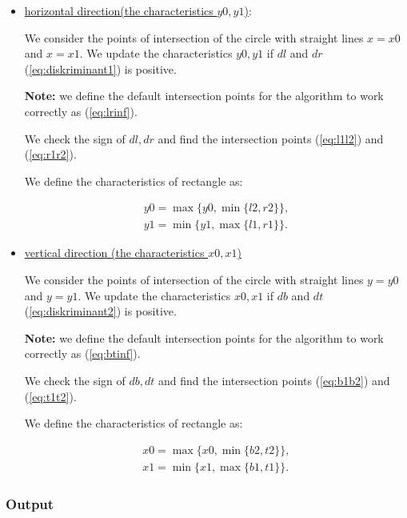 \documentclass{report}
\begin{document}
	\begin{itemize}
		
		\item \underline {horizontal direction(the characteristics $y0, y1$)}:
		
		We consider the points of intersection of the circle with straight lines $x = x0$ and $x = x1$. We update the characteristics $y0, y1$ if $dl$ and $dr$ (\ref{eq:diskriminant1}) is positive.
		
		{\bfseries Note:} we define the default intersection points for the algorithm to work correctly as (\ref{eq:lrinf}).
		
		We check the sign of $dl, dr$ and find the intersection points (\ref{eq:l1l2}) and (\ref{eq:r1r2}).
		
		We define the characteristics of rectangle as:
		
		\begin{equation}
			\begin{gathered}
				y0 = \max\{y0, \min\{l2, r2\}\},\\
				y1 = \min\{y1, \max\{l1, r1\}\}.
			\end{gathered}
		\end{equation}
		
		\item \underline {vertical direction (the characteristics $x0, x1$) }
		
		 We consider the points of intersection of the circle with straight lines $y = y0$ and $y = y1$.  We update the characteristics $x0, x1$ if $db$ and  $dt$ (\ref{eq:diskriminant2}) is positive.
		
		{\bfseries Note:} we define the default intersection points for the algorithm to work correctly as (\ref{eq:btinf}).
		
		We check the sign of $db, dt$ and find the intersection points (\ref{eq:b1b2}) and (\ref{eq:t1t2}).
		
		We define the characteristics of rectangle as:
		
		\begin{equation}
			\begin{gathered}
				x0 = \max\{x0, \min\{b2, t2\}\},\\
				x1 = \min\{x1, \max\{b1, t1\}\}.
			\end{gathered}
		\end{equation}
		
	\end{itemize}	


\subsubsection*{Output}
\end{document}
